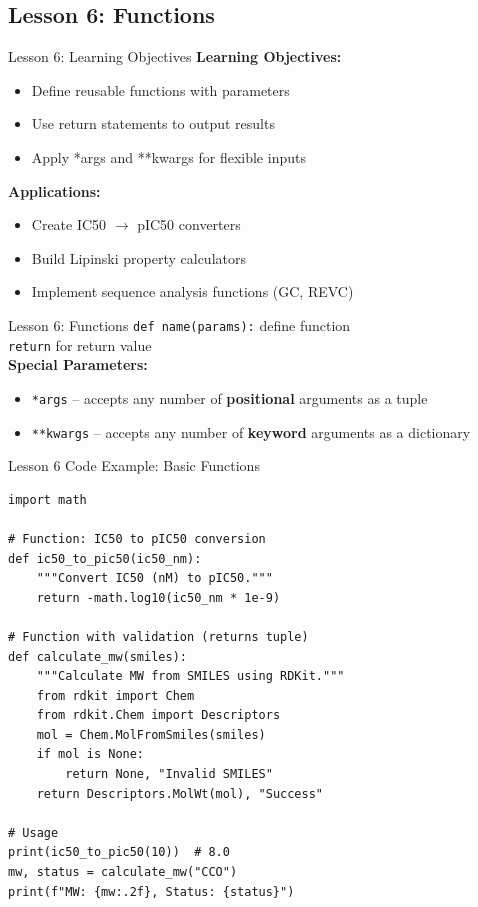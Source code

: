 \documentclass{beamer}
\begin{document}
\subsection{Lesson 6: Functions}

\begin{frame}{Lesson 6: Learning Objectives}
    \small
    \textbf{Learning Objectives:}
    \begin{itemize}
        \item Define reusable functions with parameters
        \item Use return statements to output results
        \item Apply *args and **kwargs for flexible inputs
    \end{itemize}
    \vspace{0.5em}
    \textbf{Applications:}
    \begin{itemize}
        \item Create IC50 $\to$ pIC50 converters
        \item Build Lipinski property calculators
        \item Implement sequence analysis functions (GC, REVC)
    \end{itemize}
\end{frame}

\begin{frame}{Lesson 6: Functions}
    \small
    \texttt{def name(params):} define function\\
    \texttt{return} for return value\\[0.3em]
    \textbf{Special Parameters:}
    \begin{itemize}
        \item \texttt{*args} -- accepts any number of \textbf{positional} arguments as a tuple
        \item \texttt{**kwargs} -- accepts any number of \textbf{keyword} arguments as a dictionary
    \end{itemize}
\end{frame}

\begin{frame}[fragile]{Lesson 6 Code Example: Basic Functions}
    \small
    \begin{lstlisting}[style=codeStyle]
import math

# Function: IC50 to pIC50 conversion
def ic50_to_pic50(ic50_nm):
    """Convert IC50 (nM) to pIC50."""
    return -math.log10(ic50_nm * 1e-9)

# Function with validation (returns tuple)
def calculate_mw(smiles):
    """Calculate MW from SMILES using RDKit."""
    from rdkit import Chem
    from rdkit.Chem import Descriptors
    mol = Chem.MolFromSmiles(smiles)
    if mol is None:
        return None, "Invalid SMILES"
    return Descriptors.MolWt(mol), "Success"

# Usage
print(ic50_to_pic50(10))  # 8.0
mw, status = calculate_mw("CCO")
print(f"MW: {mw:.2f}, Status: {status}")
    \end{lstlisting}
\end{frame}
\end{document}
